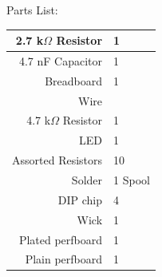 \documentclass[12pt]{article}
\begin{document}
\begin{enumerate}[1.]
%

\end{enumerate}

\newpage

\noindent Parts List:\\[0.2em]
\begin{tabular}{|r|l|}
\hline
2.7 k$\Omega$ Resistor & 1 \\ \hline
4.7 nF Capacitor & 1 \\ \hline
Breadboard & 1 \\ \hline
Wire & \\ \hline
4.7 k$\Omega$ Resistor & 1 \\ \hline
LED & 1 \\ \hline
Assorted Resistors & 10 \\ \hline
Solder & 1 Spool \\ \hline
DIP chip & 4 \\ \hline
Wick & 1 \\ \hline
Plated perfboard & 1 \\ \hline
Plain perfboard & 1 \\ \hline
\end{tabular}
\end{document}
